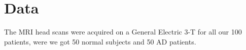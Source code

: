 \chapter{Data}

The MRI head scans were acquired on a General Electric 3-T for all our 100 patients, were we got 50 normal subjects and 50 AD patients. 

